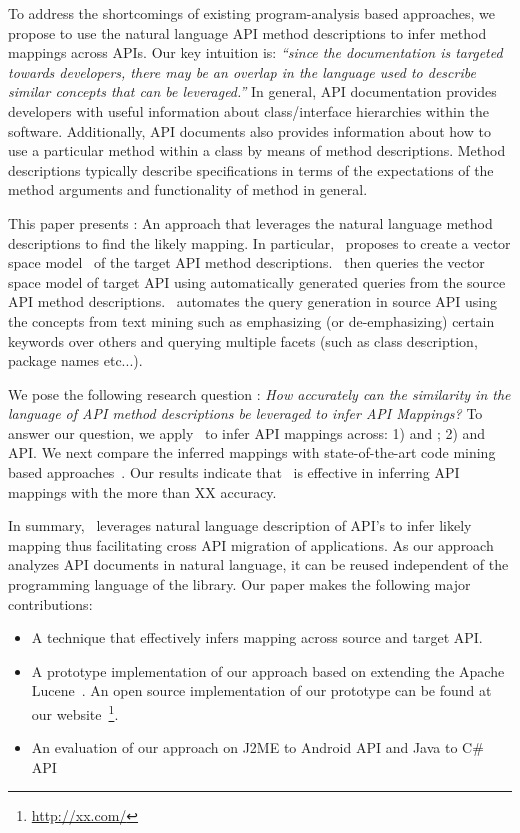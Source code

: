 To address the shortcomings of existing program-analysis based approaches,
we propose to use the natural language API method descriptions
to infer method mappings across APIs.
Our key intuition is:
\textit{``since the documentation is targeted towards developers,
	there may be an overlap in the language used to describe similar concepts that can be leveraged.''}
In general, API documentation provides developers with useful information
about class/interface hierarchies within the software.
Additionally, API documents also provides information about
how to use a particular method within a class by means of method descriptions.
Method descriptions typically describe specifications in terms of
the expectations of the method arguments and functionality of method in general.


This paper presents  \tool : An approach that leverages the natural language method descriptions to find the likely mapping.
In particular, \tool\ proposes to create a vector space model~\cite{singhal2001modern,manning2008introduction} of the target API method descriptions. 
\tool\ then queries the vector space model of target API using  
automatically generated queries from the source API method descriptions.
\tool\ automates the query generation in source API using the concepts from text mining such as emphasizing (or de-emphasizing) certain keywords over others and querying multiple facets (such as class description, package names etc...).


We pose the following research question :
\textit{How accurately can the similarity in the language of API method descriptions
	be leveraged to infer API Mappings?}
To answer our question, we apply \tool\ to infer API mappings across:
1)  and ; 2)  and  API.
We next compare the inferred mappings with state-of-the-art code mining based approaches~\cite{nguyen2014statistical,Gokhale2013ICSE}.
Our results indicate that \tool\ is effective in inferring API mappings with the more than XX accuracy.

In summary, \tool\ leverages natural language description of API's to infer likely mapping thus facilitating cross API migration of applications. As our approach analyzes API documents in natural language, it can be reused independent of the programming language of the library. Our paper makes the following major contributions:
\begin{itemize}
	\item A technique that effectively infers mapping across source and target API.
	\item A prototype implementation of our approach based on extending the Apache Lucene~\cite{lucene}. An open source implementation of our prototype can be found at our website~\footnote{\url{http://xx.com/}}. 
	\item An evaluation of our approach on J2ME to Android API and Java to C\# API
\end{itemize}


